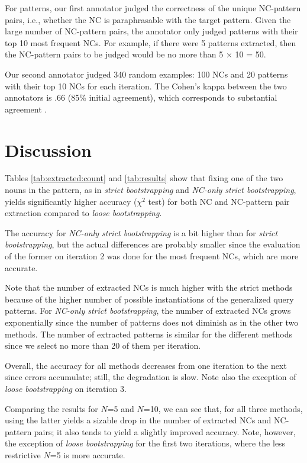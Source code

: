 \documentclass[letterpaper,11pt]{article}
\begin{document}
For patterns, our first annotator judged the correctness of the unique
NC-pattern  pairs, i.e.,  whether the  NC is  paraphrasable with the
target pattern.  Given the large  number of NC-pattern pairs,
the  annotator only  judged patterns with  their top  10 most
frequent NCs.  For example, if  there were 5 patterns  extracted, then
the NC-pattern pairs to be judged would  be no more than 5 $\times$ 10
= 50.

Our  second annotator  judged  340  random examples:  100  NCs and  20
patterns with their  top 10 NCs for each iteration.  The Cohen's kappa \cite{cohen:1960:kappa}
between the  two annotators is  .66 (85\% initial  agreement), which
corresponds to substantial agreement \cite{Landis:1977:kappa}.


\section{Discussion}
\label{sec:discussion}

Tables  \ref{tab:extracted:count} and \ref{tab:results}  show  that
fixing one of the two nouns in the pattern, as  in
\emph{strict  bootstrapping} and  \emph{NC-only strict  bootstrapping},
yields significantly higher  accuracy ($\chi^2$ test) for  both NC and
NC-pattern pair extraction compared to \emph{loose bootstrapping}.

The  accuracy for \emph{NC-only strict bootstrapping}  is a
bit higher  than for \emph{strict bootstrapping},
but the actual differences are probably smaller
since the evaluation of the former on  iteration  2 was done for the  most frequent NCs, which are more accurate.

Note that the number of extracted NCs is much higher with the strict
methods because of the higher number of possible instantiations of the
generalized query  patterns. For \emph{NC-only  strict bootstrapping},
the number  of extracted NCs  grows exponentially since the  number of
patterns does not diminish as in the other two methods.
The number of extracted patterns  is similar for the different methods
since we select no more than 20 of them per iteration.

Overall, the accuracy for all  methods decreases from one iteration to
the next since errors 
accumulate;
still, the degradation is slow.
Note also the exception of \emph{loose bootstrapping} on iteration 3.

Comparing the results  for $N$=5 and $N$=10, we can  see that, for all
three  methods,  using  the  latter  yields  a  sizable  drop  in  the
number  of  extracted NCs  and  NC-pattern  pairs;  it also  tends  to
yield a  slightly improved accuracy.  Note, however, the  exception of
\emph{loose  bootstrapping} for  the first  two iterations,  where the
less restrictive $N$=5 is more accurate.
\end{document}
